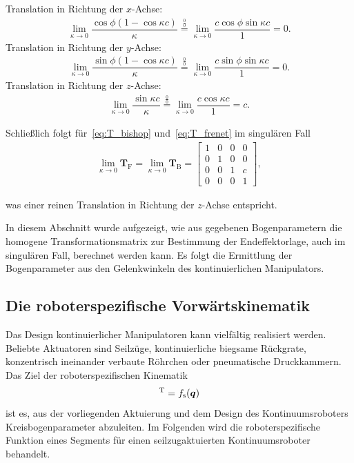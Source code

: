 Translation in Richtung der \mbox{$x$-Achse}:
\begin{align*}
\lim\limits_{\kappa \to 0} \dfrac{\cos\phi (1-\cos\kappa c)}{\kappa} \stackrel{\frac{0}{0}}{=} 
\lim\limits_{\kappa \to 0} \dfrac{c\cos\phi \sin\kappa c}{1} = 0.
\end{align*}
Translation in Richtung der \mbox{$y$-Achse}:
\begin{align*}
\lim\limits_{\kappa \to 0} \dfrac{\sin\phi (1-\cos\kappa c)}{\kappa} \stackrel{\frac{0}{0}}{=}
\lim\limits_{\kappa \to 0} \dfrac{c\sin\phi \sin\kappa c}{1} = 0.
\end{align*}
Translation in Richtung der \mbox{$z$-Achse}:
\begin{align*}
\lim\limits_{\kappa \to 0} \dfrac{\sin\kappa c}{\kappa} \stackrel{\frac{0}{0}}{=}
\lim\limits_{\kappa \to 0} \dfrac{c \cos\kappa c }{1} = c.
\end{align*}

Schließlich folgt für~\eqref{eq:T_bishop} und~\eqref{eq:T_frenet} im singulären Fall
\begin{align*}
\lim\limits_{\kappa \to 0} \bm{T}_\mathrm{F} = \lim\limits_{\kappa \to 0} \bm{T}_\mathrm{B} = 
\begin{bmatrix}
1 & 0 & 0 & 0 \\
0 & 1 & 0 & 0 \\
0 & 0 & 1 & c \\
0 & 0 & 0 & 1
\end{bmatrix},
\end{align*}

was einer reinen Translation in Richtung der $z$-Achse entspricht. \newline

In diesem Abschnitt wurde aufgezeigt, wie aus gegebenen Bogenparametern die homogene Transformationsmatrix zur Bestimmung der Endeffektorlage, auch im singulären Fall, berechnet werden kann. Es folgt die Ermittlung der Bogenparameter aus den Gelenkwinkeln des kontinuierlichen Manipulators.



\subsection{Die roboterspezifische Vorwärtskinematik}
\label{subsec:spezifischeVorwaertskinematik}

Das Design kontinuierlicher Manipulatoren kann vielfältig realisiert werden. Beliebte Aktuatoren sind Seilzüge, kontinuierliche biegsame Rückgrate, konzentrisch ineinander verbaute Röhrchen oder pneumatische Druckkammern. Das Ziel der roboterspezifischen Kinematik
\begin{align}
[\kappa, \phi, \ell]^\transpose = f_{\mathrm{s}}(\bm{q})
\label{eq:fspezifisch}
\end{align}
ist es, aus der vorliegenden Aktuierung und dem Design des Kontinuumsroboters Kreisbogenparameter abzuleiten. Im Folgenden wird die roboterspezifische Funktion eines Segments für einen seilzugaktuierten Kontinuumsroboter behandelt. \newline

